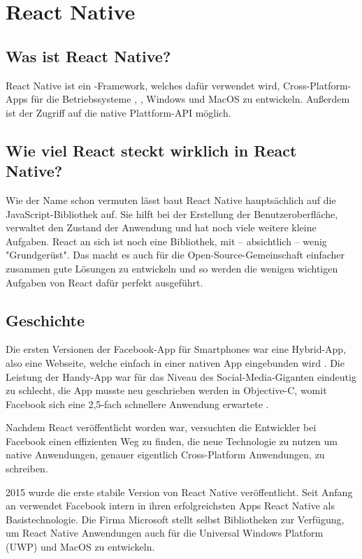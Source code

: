 \section{React Native}
\label{reactnative}

\subsection{Was ist React Native?}
React Native ist ein \underline{}-Framework, welches dafür verwendet wird,
Cross-Platform-Apps für die Betriebssysteme \underline{},
\underline{}, Windows und MacOS zu entwickeln. Außerdem ist der Zugriff auf die
native Plattform-API möglich.

\subsection{Wie viel React steckt wirklich in React Native?}
Wie der Name schon vermuten lässt baut React Native hauptsächlich auf die JavaScript-Bibliothek
\underline{} auf. Sie hilft bei der Erstellung der Benutzeroberfläche, verwaltet den Zustand
der Anwendung und hat noch viele weitere kleine Aufgaben. React an sich ist noch eine Bibliothek,
mit -- absichtlich -- wenig "Grundgerüst". Das macht es auch für die Open-Source-Gemeinschaft
einfacher zusammen gute Lösungen zu entwickeln und so werden die wenigen wichtigen Aufgaben von
React dafür perfekt ausgeführt.

\subsection{Geschichte}
Die ersten Versionen der Facebook-App für Smartphones war eine Hybrid-App, also eine Webseite,
welche einfach in einer nativen App eingebunden wird \cite{reactNativeHistory}. Die Leistung der
Handy-App war für das Niveau des Social-Media-Giganten eindeutig zu schlecht, die App musste neu
geschrieben werden in Objective-C, womit Facebook sich eine 2,5-fach schnellere Anwendung erwartete
\cite{facebookNewIosApp}.

Nachdem React veröffentlicht worden war, versuchten die Entwickler bei Facebook einen effizienten
Weg zu finden, die neue Technologie zu nutzen um native Anwendungen, genauer eigentlich
Cross-Platform Anwendungen, zu schreiben.

2015 wurde die erste stabile Version von React Native veröffentlicht. Seit Anfang an verwendet
Facebook intern in ihren erfolgreichsten Apps React Native als Basistechnologie. Die Firma Microsoft
stellt selbst Bibliotheken zur Verfügung, um React Native Anwendungen auch für die Universal Windows
Platform (UWP) und MacOS zu entwickeln.

